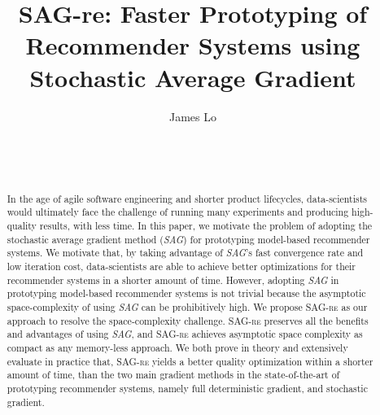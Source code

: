 \documentclass{sig-alternate}
\newcommand{\tool}{\textsc{SAG-re}\xspace}
\begin{document}


\title{{\ttlit SAG-re}: Faster Prototyping of Recommender Systems using Stochastic Average Gradient}
\author{
\alignauthor
James Lo\\	
       \\
       \\	   
       \\
}

\maketitle
\begin{abstract}
In the age of agile software engineering and shorter product lifecycles, data-scientists would ultimately face the challenge of running many experiments and producing high-quality results, with less time.
In this paper, we motivate the problem of adopting the stochastic average gradient method (\emph{SAG}) for prototyping model-based recommender systems.  
We motivate that, by taking advantage of \emph{SAG}'s fast convergence rate and low iteration cost, data-scientists are able to achieve better optimizations for their recommender systems in a shorter amount of time.
However, adopting \emph{SAG} in prototyping model-based recommender systems is not trivial because the asymptotic space-complexity of using \emph{SAG} can be prohibitively high.
We propose \tool as our approach to resolve the space-complexity challenge.
\tool preserves all the benefits and advantages of using \emph{SAG}, and \tool achieves asymptotic space complexity as compact as any memory-less approach.  
We both prove in theory and extensively evaluate in practice that, \tool yields a better quality optimization within a shorter amount of time, than the two main gradient methods in the state-of-the-art of prototyping recommender systems, namely full deterministic gradient, and stochastic gradient.

\end{abstract}
\end{document}
